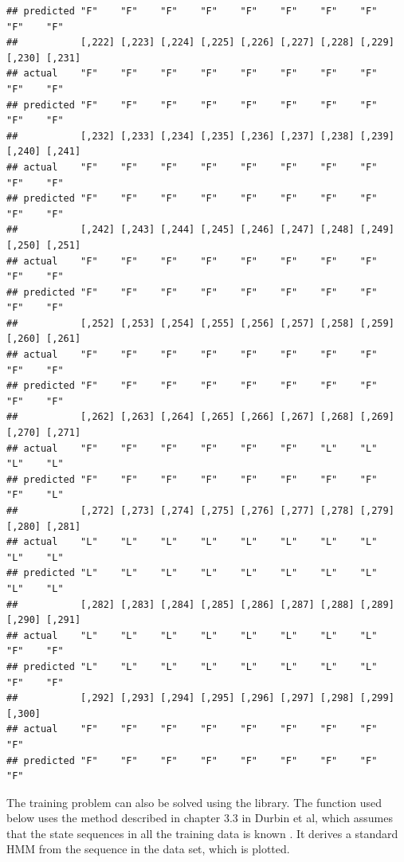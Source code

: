 \documentclass{article}\usepackage[]{graphicx}\usepackage[]{color}
\makeatletter
\newenvironment{kframe}{%
 \def\at@end@of@kframe{}%
 \ifinner\ifhmode%
  \def\at@end@of@kframe{\end{minipage}}%
  \begin{minipage}{\columnwidth}%
 \fi\fi%
 \def\FrameCommand##1{\hskip\@totalleftmargin \hskip-\fboxsep
 \colorbox{shadecolor}{##1}\hskip-\fboxsep
     \hskip-\linewidth \hskip-\@totalleftmargin \hskip\columnwidth}%
 \MakeFramed {\advance\hsize-\width
   \@totalleftmargin\z@ \linewidth\hsize
   \@setminipage}}%
 {\par\unskip\endMakeFramed%
 \at@end@of@kframe}
\newenvironment{knitrout}{}{} %
\makeatother
\begin{document}
\begin{knitrout}
\begin{kframe}
\begin{verbatim}
## predicted "F"    "F"    "F"    "F"    "F"    "F"    "F"    "F"    "F"    "F"   
##           [,222] [,223] [,224] [,225] [,226] [,227] [,228] [,229] [,230] [,231]
## actual    "F"    "F"    "F"    "F"    "F"    "F"    "F"    "F"    "F"    "F"   
## predicted "F"    "F"    "F"    "F"    "F"    "F"    "F"    "F"    "F"    "F"   
##           [,232] [,233] [,234] [,235] [,236] [,237] [,238] [,239] [,240] [,241]
## actual    "F"    "F"    "F"    "F"    "F"    "F"    "F"    "F"    "F"    "F"   
## predicted "F"    "F"    "F"    "F"    "F"    "F"    "F"    "F"    "F"    "F"   
##           [,242] [,243] [,244] [,245] [,246] [,247] [,248] [,249] [,250] [,251]
## actual    "F"    "F"    "F"    "F"    "F"    "F"    "F"    "F"    "F"    "F"   
## predicted "F"    "F"    "F"    "F"    "F"    "F"    "F"    "F"    "F"    "F"   
##           [,252] [,253] [,254] [,255] [,256] [,257] [,258] [,259] [,260] [,261]
## actual    "F"    "F"    "F"    "F"    "F"    "F"    "F"    "F"    "F"    "F"   
## predicted "F"    "F"    "F"    "F"    "F"    "F"    "F"    "F"    "F"    "F"   
##           [,262] [,263] [,264] [,265] [,266] [,267] [,268] [,269] [,270] [,271]
## actual    "F"    "F"    "F"    "F"    "F"    "F"    "L"    "L"    "L"    "L"   
## predicted "F"    "F"    "F"    "F"    "F"    "F"    "F"    "F"    "F"    "L"   
##           [,272] [,273] [,274] [,275] [,276] [,277] [,278] [,279] [,280] [,281]
## actual    "L"    "L"    "L"    "L"    "L"    "L"    "L"    "L"    "L"    "L"   
## predicted "L"    "L"    "L"    "L"    "L"    "L"    "L"    "L"    "L"    "L"   
##           [,282] [,283] [,284] [,285] [,286] [,287] [,288] [,289] [,290] [,291]
## actual    "L"    "L"    "L"    "L"    "L"    "L"    "L"    "L"    "F"    "F"   
## predicted "L"    "L"    "L"    "L"    "L"    "L"    "L"    "L"    "F"    "F"   
##           [,292] [,293] [,294] [,295] [,296] [,297] [,298] [,299] [,300]
## actual    "F"    "F"    "F"    "F"    "F"    "F"    "F"    "F"    "F"   
## predicted "F"    "F"    "F"    "F"    "F"    "F"    "F"    "F"    "F"
\end{verbatim}
\end{kframe}
\end{knitrout}

The training problem can also be solved using the library. The function used below uses the method described in chapter 3.3 in Durbin et al, which assumes that the state sequences in all the training data is known \cite{Durbin1998}. It derives a standard HMM from the sequence in the data set, which is plotted. 
\end{document}
